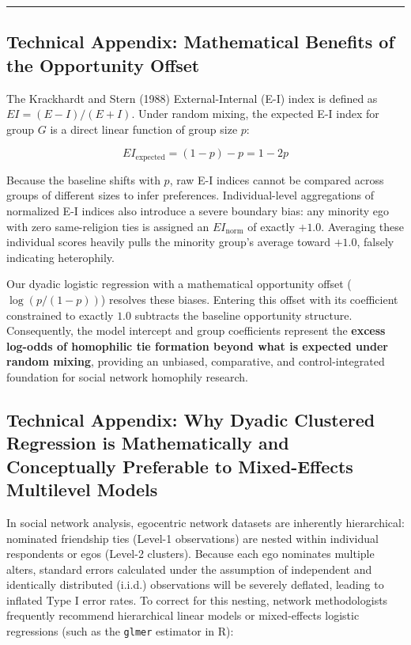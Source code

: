 \documentclass[
  letterpaper,
  DIV=11,
  numbers=noendperiod]{scrartcl}
\begin{document}
\begin{center}\rule{0.5\linewidth}{0.5pt}\end{center}

\subsection{Technical Appendix: Mathematical Benefits of the Opportunity
Offset}\label{technical-appendix-mathematical-benefits-of-the-opportunity-offset}

The Krackhardt and Stern (1988) External-Internal (E-I) index is defined
as \(EI = (E - I) / (E + I)\). Under random mixing, the expected E-I
index for group \(G\) is a direct linear function of group size \(p\):

\[EI_{\text{expected}} = (1 - p) - p = 1 - 2p\]

Because the baseline shifts with \(p\), raw E-I indices cannot be
compared across groups of different sizes to infer preferences.
Individual-level aggregations of normalized E-I indices also introduce a
severe boundary bias: any minority ego with zero same-religion ties is
assigned an \(EI_{\text{norm}}\) of exactly \(+1.0\). Averaging these
individual scores heavily pulls the minority group's average toward
\(+1.0\), falsely indicating heterophily.

Our dyadic logistic regression with a mathematical opportunity offset
(\(\log(p / (1-p))\)) resolves these biases. Entering this offset with
its coefficient constrained to exactly \(1.0\) subtracts the baseline
opportunity structure. Consequently, the model intercept and group
coefficients represent the \textbf{excess log-odds of homophilic tie
formation beyond what is expected under random mixing}, providing an
unbiased, comparative, and control-integrated foundation for social
network homophily research.

\subsection{Technical Appendix: Why Dyadic Clustered Regression is
Mathematically and Conceptually Preferable to Mixed-Effects Multilevel
Models}\label{technical-appendix-why-dyadic-clustered-regression-is-mathematically-and-conceptually-preferable-to-mixed-effects-multilevel-models}

In social network analysis, egocentric network datasets are inherently
hierarchical: nominated friendship ties (Level-1 observations) are
nested within individual respondents or egos (Level-2 clusters). Because
each ego nominates multiple alters, standard errors calculated under the
assumption of independent and identically distributed (i.i.d.)
observations will be severely deflated, leading to inflated Type I error
rates. To correct for this nesting, network methodologists frequently
recommend hierarchical linear models or mixed-effects logistic
regressions (such as the \texttt{glmer} estimator in R):
\end{document}

